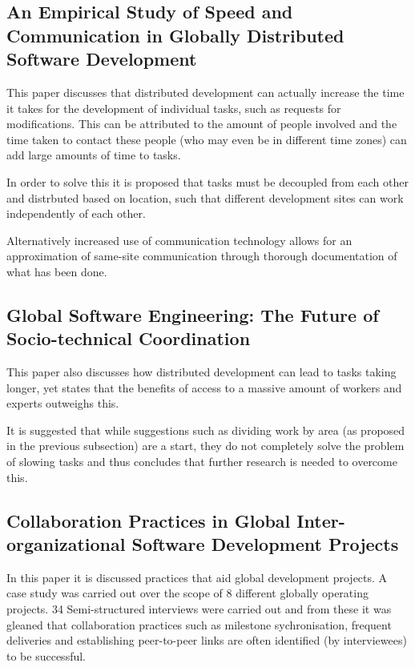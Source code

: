 \documentclass{l4proj}
\begin{document}
\subsection {An Empirical Study of Speed and Communication in Globally Distributed Software Development}

This paper discusses that distributed development can actually increase the time it takes for the development of individual tasks, such as requests for modifications.  This can be attributed to the amount of people involved and the time taken to contact these people (who may even be in different time zones) can add large amounts of time to tasks.  

In order to solve this it is proposed that tasks must be decoupled from each other and distrbuted based on location, such that different development sites can work independently of each other.

Alternatively increased use of communication technology allows for an approximation of same-site communication through thorough documentation of what has been done.

\subsection {Global Software Engineering: The Future of Socio-technical Coordination}

This paper also discusses how distributed development can lead to tasks taking longer, yet states that the benefits of access to a massive amount of workers and experts outweighs this.

It is suggested that while suggestions such as dividing work by area (as proposed in the previous subsection) are a start, they do not completely solve the problem of slowing tasks and thus concludes that further research is needed to overcome this.



\subsection {Collaboration Practices in Global Inter-organizational Software Development Projects}

In this paper it is discussed practices that aid global development projects.  A case study was carried out over the scope of 8 different globally operating projects.  34 Semi-structured interviews were carried out and from these it was gleaned that collaboration practices such as milestone sychronisation, frequent deliveries and establishing peer-to-peer links are often identified (by interviewees) to be successful. 
\end{document}
